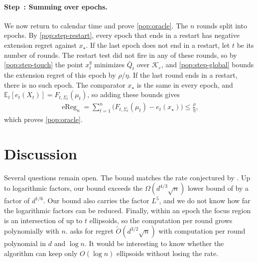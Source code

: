 \documentclass[12pt,cleveref]{jmlr}
\newcounter{popstep}
\newcommand{\popstep}[1]{\refstepcounter{popstep}\paragraph{Step~\thepopstep: #1}}
\newcommand{\E}{\mathbb E}
\newcommand{\K}{\mathcal K}
\newcommand{\eReg}{\operatorname{eReg}}
\newcommand{\1}{\mathbf 1}
\newcommand{\eps}{\varepsilon}
\newcommand{\tor}[1]{\todo[color=red!20,size=\tiny]{Tor: #1}}
\begin{document}
\popstep{Summing over epochs.}\label{pop:step-sum}
We now return to calendar time and prove \cref{pop:oracle}. The $n$ rounds split into epochs. By \cref{pop:step-restart}, every epoch that ends in a restart has negative extension regret against $x_\star$. If the last epoch does not end in a restart, let $t$ be its number of rounds. The restart test did not fire in any of these rounds, so by \cref{pop:step-touch} the point $x^q_t$ minimizes $\bar Q_t$ over $\K_\eps$, and \cref{pop:step-global} bounds the extension regret of this epoch by $\rho/\eta$. If the last round ends in a restart, there is no such epoch. The comparator $x_\star$ is the same in every epoch, and $\E_t[e_t(X_t)]=F_{t,\Sigma_t}(\mu_t)$, so adding these bounds gives
\begin{align}
    \eReg_n=\sum_{t=1}^n\bigl(F_{t,\Sigma_t}(\mu_t)-e_t(x_\star)\bigr)\leq\frac{\rho}{\eta},
\end{align}
which proves \cref{pop:oracle}.

\section{Discussion}
\label{sec:discussion}
Several questions remain open. The bound matches the rate conjectured by \citet{bubeck2017kernel}. Up to logarithmic factors, our bound exceeds the $\Omega(d^{4/3}\sqrt n)$ lower bound of \citet{rajaraman2026price} by a factor of $d^{1/6}$. Our bound also carries the factor $L^5$, and we do not know how far the logarithmic factors can be reduced. Finally, within an epoch the focus region is an intersection of up to $t$ ellipsoids, so the computation per round grows polynomially with $n$. \citet[Conjecture~1]{bubeck2017kernel} asks for regret $\widetilde O(d^{3/2}\sqrt n)$ with computation per round polynomial in $d$ and $\log n$. It would be interesting to know whether the algorithm can keep only $O(\log n)$ ellipsoids without losing the rate.
\end{document}
